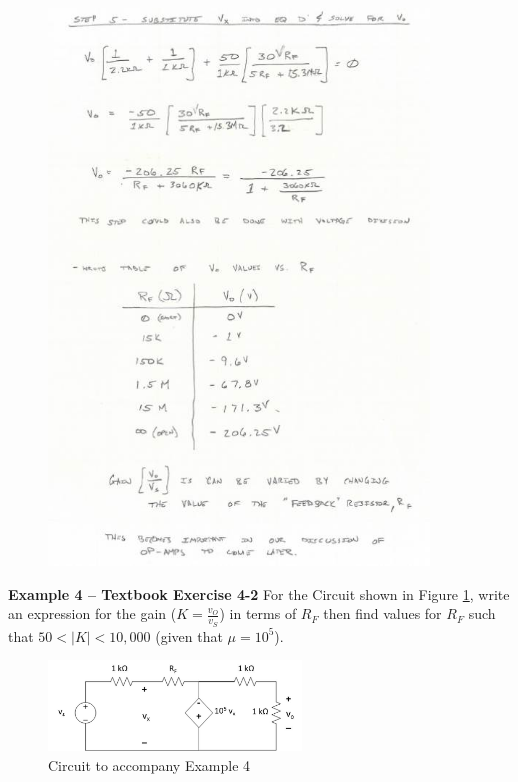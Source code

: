 \documentclass{handout}
\begin{document}
{\begin{figure}[h! t! b!]
\centering
\includegraphics[width=0.9\textwidth]{Example3solnC.jpg}
\end{figure}

}
\newpage
\clearpage
\pagebreak

\textbf{Example 4 -- Textbook Exercise 4-2}
For the Circuit shown in Figure \ref{fig: Example4}, write an expression for the gain ($K=\frac{v_O}{v_S}$) in terms of $R_F$ then find values for $R_F$ such that $50<|K|<10,000$ (given that $\mu=10^5$).
\begin{figure}[h! t! b!]
\centering
\includegraphics[width=0.6\textwidth]{Example4.jpg}
\caption{Circuit to accompany Example 4}
\label{fig: Example4}
\end{figure}
\end{document}

